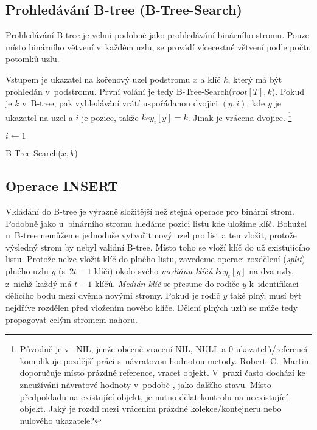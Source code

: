 \subsection{Prohledávání B-tree (B-Tree-Search)}

Prohledávání B-tree je velmi podobné jako prohledávání binárního stromu\@.
Pouze místo binárního větvení v~každém uzlu, se provádí vícecestné
větvení podle počtu potomků uzlu\@.

Vstupem je ukazatel na kořenový uzel podstromu $x$ a klíč $k$, který
má být prohledán v~podstromu\@. První volání je tedy B-Tree-Search($root[T],k$).
Pokud je $k$ v~B-tree, pak vyhledávání vrátí uspořádanou dvojici
$(y,i)$, kde $y$ je ukazatel na uzel a $i$ je pozice, takže $key_{i}[y]=k$\@.
Jinak je vrácena  dvojice.
\footnote{Původně je v~\cite{Cormen:2001:IA:580470} NIL, jenže obecně vracení
NIL, NULL a 0 ukazatelů/referencí komplikuje pozdější práci s~návratovou
hodnotou metody. Robert~C.~Martin doporučuje místo prázdné
reference, vracet  objekt\cite{martin2009clean}.
V~praxi často dochází ke zneužívání návratové hodnoty v~podobě
, jako dalšího stavu. Místo předpokladu na existující objekt,
je nutno dělat kontrolu na neexistující objekt. Jaký je rozdíl mezi
vrácením prázdné kolekce/kontejneru nebo nulového ukazatele?
}

\begin{algorithm}[t]
\SetAlgoLined
{}

$i \longleftarrow 1$\\

\caption{B-Tree-Search($x,k$)}
\end{algorithm}



\subsection{Operace INSERT}

Vkládání do B-tree je výrazně složitější než stejná operace pro binární strom.
Podobně jako u~binárního stromu hledáme pozici listu kde uložíme klíč.
Bohužel u~B-tree nemůžeme jednoduše vytvořit nový uzel pro list a ten vložit, protože výsledný strom by nebyl validní B-tree.
Místo toho se vloží klíč do už existujícího listu.
Protože nelze vložit klíč do plného listu, zavedeme operaci rozdělení (\emph{split}) plného uzlu $y$ (s~$2t-1$ klíči) okolo svého \emph{mediánu klíčů} $key_{t}[y]$ na dva uzly, z~nichž každý má $t-1$ klíčů.
\emph{Medián klíč} se přesune do rodiče $y$ k~identifikaci dělícího bodu mezi dvěma novými stromy.
Pokud je rodič $y$ také plný, musí být nejdříve rozdělen před vložením nového klíče.
Dělení plných uzlů se může tedy propagovat celým stromem nahoru.

